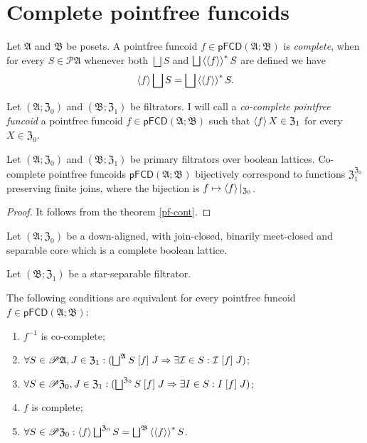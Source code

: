 \section{Complete pointfree funcoids}
\begin{defn}
Let $\mathfrak{A}$ and $\mathfrak{B}$
be posets. A pointfree funcoid $f\in\mathsf{pFCD}(\mathfrak{A};\mathfrak{B})$
is \emph{complete}, when for every $S\in\mathscr{P}\mathfrak{A}$
whenever both $\bigsqcup S$ and $\bigsqcup\rsupfun{\supfun f}S$
are defined we have
\[
\supfun f\bigsqcup S=\bigsqcup\rsupfun{\supfun f}S.
\]
\end{defn}
\begin{defn}
Let $(\mathfrak{A};\mathfrak{Z}_{0})$
and $(\mathfrak{B};\mathfrak{Z}_{1})$ be filtrators. I will call a \emph{co-complete pointfree funcoid}
a pointfree funcoid $f\in\mathsf{pFCD}(\mathfrak{A};\mathfrak{B})$
such that $\left\langle f\right\rangle X\in\mathfrak{Z}_1$ for every $X\in\mathfrak{Z}_0$.\end{defn}
\begin{prop}
Let $(\mathfrak{A};\mathfrak{Z}_{0})$ and $(\mathfrak{B};\mathfrak{Z}_{1})$
be primary filtrators over boolean lattices. Co-complete pointfree
funcoids $\mathsf{pFCD}(\mathfrak{A};\mathfrak{B})$ bijectively correspond
to functions $\mathfrak{Z}_{1}^{\mathfrak{Z}_{0}}$ preserving finite
joins, where the bijection is $f\mapsto\left\langle f\right\rangle|_{\mathfrak{Z}_{0}}$.\end{prop}
\begin{proof}
It follows from the theorem \ref{pf-cont}.\end{proof}
\begin{thm}
\label{pf-compl-conds}Let $(\mathfrak{A};\mathfrak{Z}_0)$ be a down-aligned,
with join-closed, binarily meet-closed and separable core which is
a complete boolean lattice.

Let $(\mathfrak{B};\mathfrak{Z}_{1})$ be a star-separable filtrator.

The following conditions are equivalent for every pointfree funcoid
$f\in\mathsf{pFCD}(\mathfrak{A};\mathfrak{B})$:
\begin{enumerate}
\item \label{pf-ax:fcd-full-main}$f^{-1}$ is co-complete;
\item \label{pf-ax:fcd-full-fa-filt}$\forall S\in\mathscr{P}\mathfrak{A},J\in\mathfrak{Z}_{1}:(\bigsqcup^{\mathfrak{A}}S\suprel fJ\Rightarrow\exists\mathcal{I}\in S:\mathcal{I}\suprel fJ)$;
\item \label{pf-ax:fcd-full-fa-set}$\forall S\in\mathscr{P}\mathfrak{Z}_{0},J\in\mathfrak{Z}_{1}:(\bigsqcup^{\mathfrak{Z}_{0}}S\suprel fJ\Rightarrow\exists I\in S:I\suprel fJ)$;
\item \label{pf-ax:fcd-full-eq-filt}$f$ is complete;
\item \label{pf-ax:fcd-full-eq-set}$\forall S\in\mathscr{P}\mathfrak{Z}_{0}:\supfun f\bigsqcup^{\mathfrak{Z}_{0}}S=\bigsqcup^{\mathfrak{B}}\rsupfun{\supfun f}S$.
\end{enumerate}
\end{thm}
